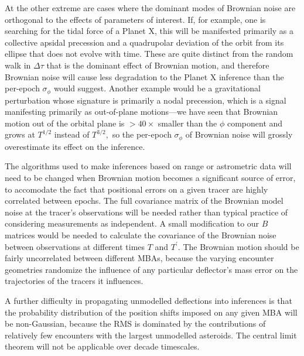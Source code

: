 \documentclass[linenumbers, onecolumn]{aastex631}
\newcommand\edited[1]{{\color{red} {#1}}}
\newcommand{\matB}{B}
\begin{document}
At the other extreme are cases where the dominant modes of Brownian noise are orthogonal to the effects of parameters of interest.  
If, for example, one is searching for the tidal force of a Planet X, this will be manifested primarily as a collective apsidal precession and a quadrupolar deviation of the orbit from its ellipse that does not evolve with time.  These are quite distinct from the random walk in $\Delta\tau$ that is the dominant effect of Brownian motion, and therefore Brownian noise will cause less degradation to the Planet X inference than the per-epoch $\sigma_\phi$ would suggest.  Another example would be a gravitational perturbation whose signature is primarily a nodal precession, which is a signal manifesting primarily as out-of-plane motions---we have seen that Brownian motion out of the orbital plane is $>40\times$ smaller than the $\phi$ component and grows at $T^{1/2}$ instead of $T^{3/2},$ so the per-epoch $\sigma_\phi$ of Brownian noise will grossly overestimate its effect on the inference.

The algorithms used to make inferences based on range or astrometric
data will need to be changed when Brownian motion becomes a
significant source of error, to accomodate the fact that positional
errors on a given tracer are highly correlated between epochs.  The
full covariance matrix of the Brownian model noise at the tracer's observations will be needed
rather than typical practice of considering measurements as
independent.  A small modification to our $\matB$ matrices would be
needed to calculate the covariance of the Brownian noise between
observations at different times $T$ and $T^\prime.$  The Brownian
motion should be fairly uncorrelated between different MBAs, because
the varying encounter geometries randomize the influence of any
particular deflector's mass error on the trajectories of the tracers
it influences.

A further difficulty in propagating unmodelled deflections into
inferences is that the probability distribution of the position shifts \edited{imposed on any given MBA}
will be non-Gaussian, because the RMS is dominated by the
contributions of relatively few encounters with the largest unmodelled
asteroids.  The central limit theorem will not be applicable over
decade timescales.
\end{document}
